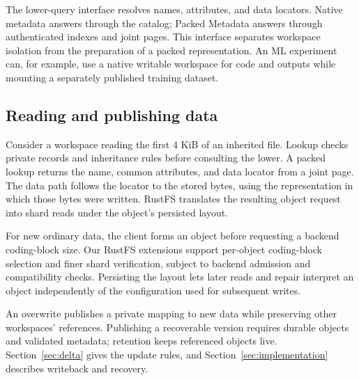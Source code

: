 The lower-query interface resolves names, attributes, and data locators.
Native metadata answers through the catalog; Packed Metadata answers
through authenticated indexes and joint pages. This interface separates
workspace isolation from the preparation of a packed representation.
An ML experiment can, for example, use a native writable workspace for
code and outputs while mounting a separately published training dataset.

\subsection{Reading and publishing data}

Consider a workspace reading the first 4 KiB of an inherited file.
Lookup checks private records and inheritance rules before consulting
the lower. A packed lookup returns the name, common attributes, and
data locator from a joint page. The data path follows the locator to
the stored bytes, using the representation in which those bytes were
written. RustFS translates the resulting object request into shard
reads under the object's persisted layout.

For new ordinary data, the client forms an object before requesting
a backend coding-block size. Our RustFS extensions support per-object
coding-block selection and finer shard verification, subject to backend
admission and compatibility checks. Persisting
the layout lets later reads and repair interpret an object independently
of the configuration used for subsequent writes.

An overwrite publishes a private mapping to new data while preserving
other workspaces' references. Publishing a recoverable version requires
durable objects and validated metadata; retention keeps referenced
objects live. Section~\ref{sec:delta} gives the update rules, and
Section~\ref{sec:implementation} describes writeback and recovery.
